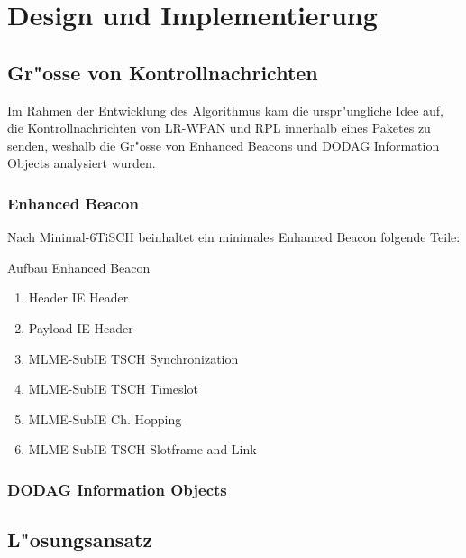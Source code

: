 \section{Design und Implementierung}
\label{sec:design_implementierung}



\subsection{Gr"osse von Kontrollnachrichten}
\label{subsec:di_ctrlmsg_length}

Im Rahmen der Entwicklung des Algorithmus kam die urspr"ungliche Idee auf,
die Kontrollnachrichten von LR-WPAN und RPL innerhalb eines Paketes zu senden,
weshalb die Gr"osse von Enhanced Beacons und DODAG Information Objects analysiert
wurden.


\subsubsection{Enhanced Beacon}
\label{subsubsec:di_eb}
Nach Minimal-6TiSCH beinhaltet ein minimales Enhanced Beacon folgende Teile:

Aufbau Enhanced Beacon
\begin{enumerate}
  \item Header IE Header
  \item Payload IE Header
  \item MLME-SubIE TSCH Synchronization
  \item MLME-SubIE TSCH Timeslot
  \item MLME-SubIE Ch. Hopping
  \item MLME-SubIE TSCH Slotframe and Link
\end{enumerate}

\subsubsection{DODAG Information Objects}
\label{subsubsec:di_dio}




\subsection{L"osungsansatz}
\label{subsec:di_loesungsansatz}


